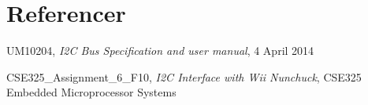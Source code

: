 \chapter{Referencer}

\begin{thebibliography}{9}
	
	UM10204,
	\textit{I2C Bus Specification and user manual}, 4 April 2014
	
	CSE325\_Assignment\_6\_F10,
	\textit{I2C Interface with Wii Nunchuck}, CSE325 Embedded Microprocessor Systems
	
\end{thebibliography}